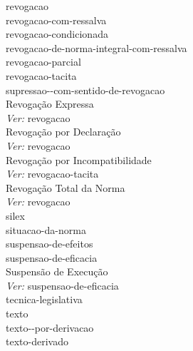 \Gls{revogacao} \\ 
 \hspace*{1.0cm}\glosshsep \Gls{revogacao-com-ressalva} \\ 
 \hspace*{1.0cm}\glosshsep \Gls{revogacao-condicionada} \\ 
 \hspace*{1.0cm}\glosshsep \Gls{revogacao-de-norma-integral-com-ressalva} \\ 
 \hspace*{1.0cm}\glosshsep \Gls{revogacao-parcial} \\ 
 \hspace*{1.0cm}\glosshsep \Gls{revogacao-tacita} \\ 
 \hspace*{1.0cm}\glosshsep \Gls{supressao--com-sentido-de-revogacao} \\ 
Revogação Expressa \\ 
 \hspace*{1.0cm}\glosshsep \textit{Ver:} \Gls{revogacao} \\ 
Revogação por Declaração \\ 
 \hspace*{1.0cm}\glosshsep \textit{Ver:} \Gls{revogacao} \\ 
Revogação por Incompatibilidade \\ 
 \hspace*{1.0cm}\glosshsep \textit{Ver:} \Gls{revogacao-tacita} \\ 
Revogação Total da Norma \\ 
 \hspace*{1.0cm}\glosshsep \textit{Ver:} \Gls{revogacao} \\ 
\Gls{silex} \\ 
\Gls{situacao-da-norma} \\ 
\Gls{suspensao-de-efeitos} \\ 
\Gls{suspensao-de-eficacia} \\ 
Suspensão de Execução \\ 
 \hspace*{1.0cm}\glosshsep \textit{Ver:} \Gls{suspensao-de-eficacia} \\ 
\Gls{tecnica-legislativa} \\ 
\Gls{texto} \\ 
 \hspace*{1.0cm}\glosshsepclass \Gls{texto--por-derivacao} \\ 
 \hspace*{2.0cm}\glosshsep \Gls{texto-derivado} \\ 
